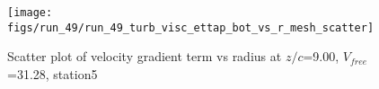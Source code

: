 \begin{figure}[H]
\centering
\texttt{[image: figs/run\_49/run\_49\_turb\_visc\_ettap\_bot\_vs\_r\_mesh\_scatter]}
\caption{Scatter plot of velocity gradient term vs radius at $z/c$=9.00, $V_{free}$=31.28, station5}
\label{fig:run_49_turb_visc_ettap_bot_vs_r_mesh_scatter}
\end{figure}


